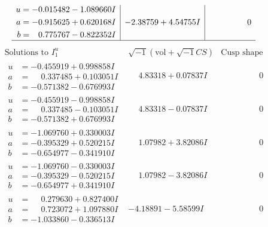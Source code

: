 \documentclass[1p]{elsarticle_modified}
\theoremstyle{definition}
\newcommand{\I}{\sqrt{-1}}
\begin{document}
$$\begin{array}{c|c|c}
\begin{aligned}
u &= -0.015482 - 1.089660 I \\
a &= -0.915625 + 0.620168 I \\
b &= \phantom{-}0.775767 - 0.822352 I\end{aligned}
 & -2.38759 + 4.54755 I & \phantom{-0.000000 } 0\\
 \hline 
 \end{array}$$\newpage$$\begin{array}{c|c|c}  
\text{Solutions to }I^u_{1}& \I (\text{vol} + \sqrt{-1}CS) & \text{Cusp shape}\\
 \hline 
\begin{aligned}
u &= -0.455919 + 0.998858 I \\
a &= \phantom{-}0.337485 + 0.103051 I \\
b &= -0.571382 - 0.676993 I\end{aligned}
 & \phantom{-}4.83318 + 0.07837 I & \phantom{-0.000000 } 0 \\ \hline\begin{aligned}
u &= -0.455919 - 0.998858 I \\
a &= \phantom{-}0.337485 - 0.103051 I \\
b &= -0.571382 + 0.676993 I\end{aligned}
 & \phantom{-}4.83318 - 0.07837 I & \phantom{-0.000000 } 0 \\ \hline\begin{aligned}
u &= -1.069760 + 0.330003 I \\
a &= -0.395329 + 0.520215 I \\
b &= -0.654977 - 0.341910 I\end{aligned}
 & \phantom{-}1.07982 + 3.82086 I & \phantom{-0.000000 } 0 \\ \hline\begin{aligned}
u &= -1.069760 - 0.330003 I \\
a &= -0.395329 - 0.520215 I \\
b &= -0.654977 + 0.341910 I\end{aligned}
 & \phantom{-}1.07982 - 3.82086 I & \phantom{-0.000000 } 0 \\ \hline\begin{aligned}
u &= \phantom{-}0.279630 + 0.827400 I \\
a &= \phantom{-}0.723072 + 1.097880 I \\
b &= -1.033860 - 0.336513 I\end{aligned}
 & -4.18891 - 5.58599 I & \phantom{-0.000000 } 0 \\ \hline\begin{aligned}

\end{aligned}
\end{array}$$
\end{document}
